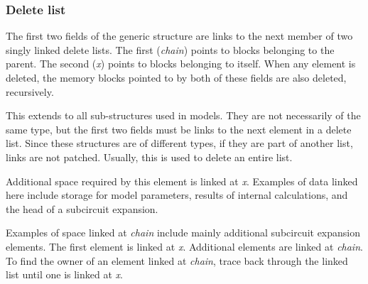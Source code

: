 \subsubsection{Delete list}

The first two fields of the generic structure are links to the next member
of two singly linked delete lists.  The first ({\em chain\/}) points to
blocks belonging to the parent.  The second ({\em x\/}) points to blocks
belonging to itself.  When any element is deleted, the memory blocks pointed
to by both of these fields are also deleted, recursively.

This extends to all sub-structures used in models.  They are not necessarily
of the same type, but the first two fields must be links to the next element in
a delete list.  Since these structures are of different types, if they are
part of another list, links are not patched.  Usually, this is used to
delete an entire list.

Additional space required by this element is linked at {\em x}.  Examples of
data linked here include storage for model parameters, results of internal
calculations, and the head of a subcircuit expansion.

Examples of space linked at {\em chain} include mainly additional subcircuit
expansion elements.  The first element is linked at {\em x}.  Additional
elements are linked at {\em chain}.  To find the owner of an element linked
at {\em chain}, trace back through the linked list until one is linked at
{\em x}.
